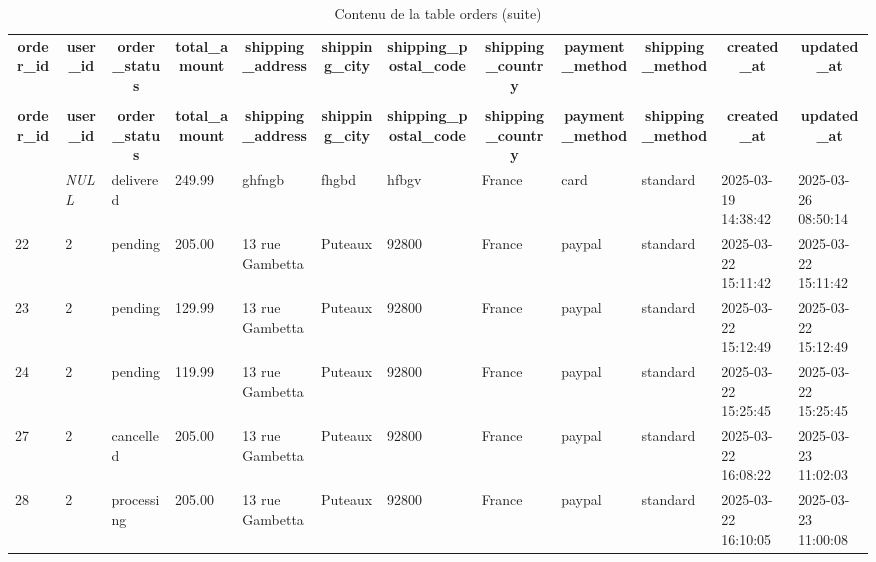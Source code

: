 %
%
 \begin{longtable}{|l|l|l|l|l|l|l|l|l|l|l|l|} 
 \hline \endhead \hline \endfoot \hline 
 \caption{Contenu de la table orders} \label{tab:orders-data} \\\hline \multicolumn{1}{|c|}{\textbf{order\_id}} & \multicolumn{1}{|c|}{\textbf{user\_id}} & \multicolumn{1}{|c|}{\textbf{order\_status}} & \multicolumn{1}{|c|}{\textbf{total\_amount}} & \multicolumn{1}{|c|}{\textbf{shipping\_address}} & \multicolumn{1}{|c|}{\textbf{shipping\_city}} & \multicolumn{1}{|c|}{\textbf{shipping\_postal\_code}} & \multicolumn{1}{|c|}{\textbf{shipping\_country}} & \multicolumn{1}{|c|}{\textbf{payment\_method}} & \multicolumn{1}{|c|}{\textbf{shipping\_method}} & \multicolumn{1}{|c|}{\textbf{created\_at}} & \multicolumn{1}{|c|}{\textbf{updated\_at}} \\ \hline \hline  \endfirsthead 
\caption{Contenu de la table orders (suite)} \\ \hline \multicolumn{1}{|c|}{\textbf{order\_id}} & \multicolumn{1}{|c|}{\textbf{user\_id}} & \multicolumn{1}{|c|}{\textbf{order\_status}} & \multicolumn{1}{|c|}{\textbf{total\_amount}} & \multicolumn{1}{|c|}{\textbf{shipping\_address}} & \multicolumn{1}{|c|}{\textbf{shipping\_city}} & \multicolumn{1}{|c|}{\textbf{shipping\_postal\_code}} & \multicolumn{1}{|c|}{\textbf{shipping\_country}} & \multicolumn{1}{|c|}{\textbf{payment\_method}} & \multicolumn{1}{|c|}{\textbf{shipping\_method}} & \multicolumn{1}{|c|}{\textbf{created\_at}} & \multicolumn{1}{|c|}{\textbf{updated\_at}} \\ \hline \hline \endhead \endfoot
1 & \textit{NULL} & delivered & 249.99 & ghfngb & fhgbd & hfbgv & France & card & standard & 2025-03-19 14:38:42 & 2025-03-26 08:50:14 \\ \hline 
22 & 2 & pending & 205.00 & 13 rue Gambetta & Puteaux & 92800 & France & paypal & standard & 2025-03-22 15:11:42 & 2025-03-22 15:11:42 \\ \hline 
23 & 2 & pending & 129.99 & 13 rue Gambetta & Puteaux & 92800 & France & paypal & standard & 2025-03-22 15:12:49 & 2025-03-22 15:12:49 \\ \hline 
24 & 2 & pending & 119.99 & 13 rue Gambetta & Puteaux & 92800 & France & paypal & standard & 2025-03-22 15:25:45 & 2025-03-22 15:25:45 \\ \hline 
27 & 2 & cancelled & 205.00 & 13 rue Gambetta & Puteaux & 92800 & France & paypal & standard & 2025-03-22 16:08:22 & 2025-03-23 11:02:03 \\ \hline 
28 & 2 & processing & 205.00 & 13 rue Gambetta & Puteaux & 92800 & France & paypal & standard & 2025-03-22 16:10:05 & 2025-03-23 11:00:08 \\ \hline 

\end{longtable}
